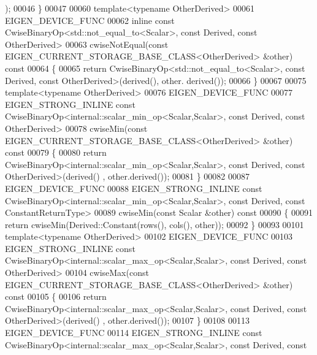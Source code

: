 \begin{DoxyCode}
      );
00046 \}
00047 
00060 \textcolor{keyword}{template}<\textcolor{keyword}{typename} OtherDerived>
00061 EIGEN\_DEVICE\_FUNC
00062 \textcolor{keyword}{inline} \textcolor{keyword}{const} CwiseBinaryOp<std::not\_equal\_to<Scalar>, \textcolor{keyword}{const} Derived, \textcolor{keyword}{const} OtherDerived>
00063 cwiseNotEqual(\textcolor{keyword}{const} EIGEN\_CURRENT\_STORAGE\_BASE\_CLASS<OtherDerived> &other)\textcolor{keyword}{ const}
00064 \textcolor{keyword}{}\{
00065   \textcolor{keywordflow}{return} CwiseBinaryOp<std::not\_equal\_to<Scalar>, \textcolor{keyword}{const} Derived, \textcolor{keyword}{const} OtherDerived>(derived(), other.
      derived());
00066 \}
00067 
00075 \textcolor{keyword}{template}<\textcolor{keyword}{typename} OtherDerived>
00076 EIGEN\_DEVICE\_FUNC
00077 EIGEN\_STRONG\_INLINE \textcolor{keyword}{const} CwiseBinaryOp<internal::scalar\_min\_op<Scalar,Scalar>, \textcolor{keyword}{const} Derived, \textcolor{keyword}{const} 
      OtherDerived>
00078 cwiseMin(\textcolor{keyword}{const} EIGEN\_CURRENT\_STORAGE\_BASE\_CLASS<OtherDerived> &other)\textcolor{keyword}{ const}
00079 \textcolor{keyword}{}\{
00080   \textcolor{keywordflow}{return} CwiseBinaryOp<internal::scalar\_min\_op<Scalar,Scalar>, \textcolor{keyword}{const} Derived, \textcolor{keyword}{const} OtherDerived>(derived()
      , other.derived());
00081 \}
00082 
00087 EIGEN\_DEVICE\_FUNC
00088 EIGEN\_STRONG\_INLINE \textcolor{keyword}{const} CwiseBinaryOp<internal::scalar\_min\_op<Scalar,Scalar>, \textcolor{keyword}{const} Derived, \textcolor{keyword}{const} 
      ConstantReturnType>
00089 cwiseMin(\textcolor{keyword}{const} Scalar &other)\textcolor{keyword}{ const}
00090 \textcolor{keyword}{}\{
00091   \textcolor{keywordflow}{return} cwiseMin(Derived::Constant(rows(), cols(), other));
00092 \}
00093 
00101 \textcolor{keyword}{template}<\textcolor{keyword}{typename} OtherDerived>
00102 EIGEN\_DEVICE\_FUNC
00103 EIGEN\_STRONG\_INLINE \textcolor{keyword}{const} CwiseBinaryOp<internal::scalar\_max\_op<Scalar,Scalar>, \textcolor{keyword}{const} Derived, \textcolor{keyword}{const} 
      OtherDerived>
00104 cwiseMax(\textcolor{keyword}{const} EIGEN\_CURRENT\_STORAGE\_BASE\_CLASS<OtherDerived> &other)\textcolor{keyword}{ const}
00105 \textcolor{keyword}{}\{
00106   \textcolor{keywordflow}{return} CwiseBinaryOp<internal::scalar\_max\_op<Scalar,Scalar>, \textcolor{keyword}{const} Derived, \textcolor{keyword}{const} OtherDerived>(derived()
      , other.derived());
00107 \}
00108 
00113 EIGEN\_DEVICE\_FUNC
00114 EIGEN\_STRONG\_INLINE \textcolor{keyword}{const} CwiseBinaryOp<internal::scalar\_max\_op<Scalar,Scalar>, \textcolor{keyword}{const} Derived, \textcolor{keyword}{const} 

\end{DoxyCode}
